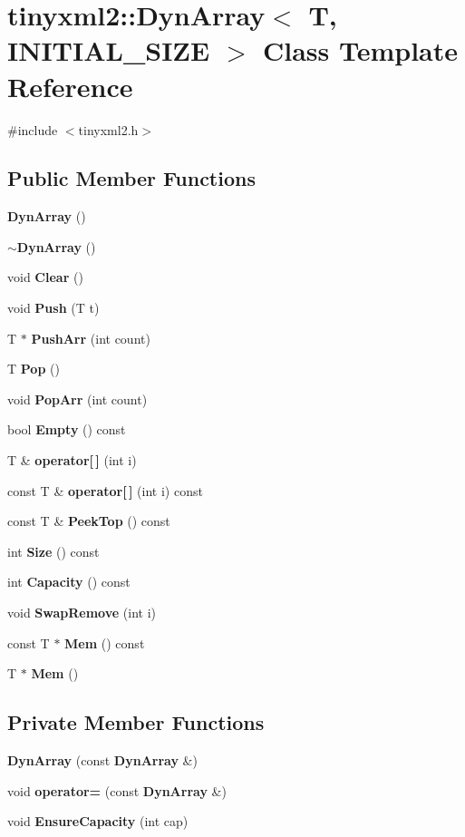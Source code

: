 \section{tinyxml2\+::Dyn\+Array$<$ T, I\+N\+I\+T\+I\+A\+L\+\_\+\+S\+I\+ZE $>$ Class Template Reference}
\label{classtinyxml2_1_1_dyn_array}


{\ttfamily \#include $<$tinyxml2.\+h$>$}

\subsection*{Public Member Functions}
\begin{DoxyCompactItemize}
\item 
\textbf{ Dyn\+Array} ()
\item 
\textbf{ $\sim$\+Dyn\+Array} ()
\item 
void \textbf{ Clear} ()
\item 
void \textbf{ Push} (T t)
\item 
T $\ast$ \textbf{ Push\+Arr} (int count)
\item 
T \textbf{ Pop} ()
\item 
void \textbf{ Pop\+Arr} (int count)
\item 
bool \textbf{ Empty} () const
\item 
T \& \textbf{ operator[$\,$]} (int i)
\item 
const T \& \textbf{ operator[$\,$]} (int i) const
\item 
const T \& \textbf{ Peek\+Top} () const
\item 
int \textbf{ Size} () const
\item 
int \textbf{ Capacity} () const
\item 
void \textbf{ Swap\+Remove} (int i)
\item 
const T $\ast$ \textbf{ Mem} () const
\item 
T $\ast$ \textbf{ Mem} ()
\end{DoxyCompactItemize}
\subsection*{Private Member Functions}
\begin{DoxyCompactItemize}
\item 
\textbf{ Dyn\+Array} (const \textbf{ Dyn\+Array} \&)
\item 
void \textbf{ operator=} (const \textbf{ Dyn\+Array} \&)
\item 
void \textbf{ Ensure\+Capacity} (int cap)
\end{DoxyCompactItemize}
